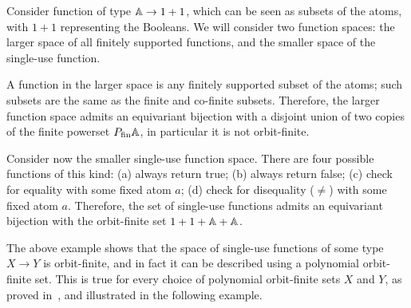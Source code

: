 \begin{example}\label{ex:first-single-use-function-space}
    Consider function of type $\mathbb A \to 1 + 1$, which can be seen as subsets of the atoms, with $1+1$ representing the Booleans. We will consider two function spaces: the larger space of all finitely supported functions, and the smaller space of the single-use function.
    
    A function in the larger space is any finitely supported subset of the atoms; such subsets are the same as the finite and co-finite subsets. Therefore, the larger function space admits an equivariant bijection with a disjoint union of two copies of the finite powerset $\powerset_{\text{fin}} \atoms$, in particular it is not orbit-finite.
    
    Consider now the smaller single-use function space. There are four possible functions of this kind: (a) always return true; (b) always return false; (c) check for equality with some fixed atom $a$; (d) check for disequality ($\neq$) with some fixed atom $a$.  Therefore,  the set of single-use functions  admits an equivariant bijection with the orbit-finite set $1 + 1 + \mathbb A + \mathbb A$.
    \exampleend
\end{example}


The above example shows that the space of single-use functions of some type $X \to Y$ is orbit-finite, and in fact it can be described using a polynomial orbit-finite set. This is true for every choice of polynomial orbit-finite sets $X$ and $Y$, as proved in~\cite[Theorem 5]{stefanski-phd}, and illustrated in the following example. 

